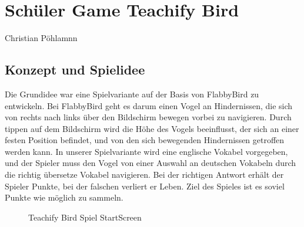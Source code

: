 
\chapter{Schüler Game Teachify Bird}
Christian Pöhlamnn

\section{Konzept und Spielidee}
Die Grundidee war eine Spielvariante auf der Basis von FlabbyBird zu entwickeln.
Bei FlabbyBird geht es darum einen Vogel an Hindernissen, die sich von rechts nach links über den Bildschirm bewegen vorbei zu navigieren. Durch tippen auf dem Bildschirm wird die Höhe des Vogels beeinflusst, der sich an einer festen Position befindet, und von den sich bewegenden Hindernissen getroffen werden kann.
In unserer Spielvariante wird eine englische Vokabel vorgegeben, und der Spieler muss den Vogel von einer Auswahl an deutschen Vokabeln durch die richtig übersetze Vokabel navigieren. Bei der richtigen Antwort erhält der Spieler Punkte, bei der falschen verliert er Leben.
Ziel des Spieles ist es soviel Punkte wie möglich zu sammeln.

\begin{figure}[H]
	\centering
	\caption{Teachify Bird Spiel StartScreen}
	\label{Der Login Bildschirm}
\end{figure}

